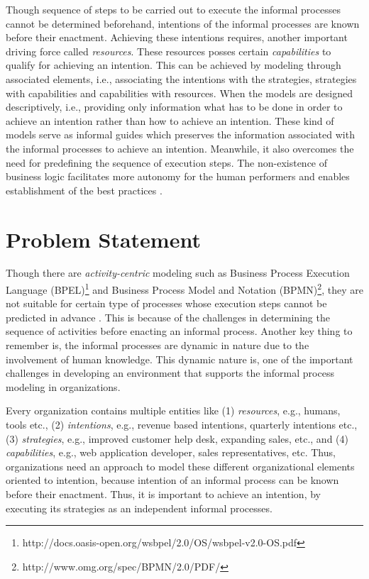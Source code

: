 Though sequence of steps to be carried out to execute the informal processes cannot be determined beforehand, intentions of the informal processes are known before their enactment. Achieving these intentions requires, another important driving force called \textit{resources}. These resources posses certain \textit{capabilities} to qualify for achieving an intention. This can be achieved by modeling through associated elements, i.e., associating the intentions with the strategies, strategies with capabilities and capabilities with resources. When the models are designed descriptively, i.e., providing only information what has to be done in order to achieve an intention rather than how to achieve an intention. These kind of models serve as informal guides which preserves the information associated with the informal processes to achieve an intention. Meanwhile, it also overcomes the need for predefining the sequence of execution steps. The non-existence of business logic facilitates more autonomy for the human performers and enables establishment of the best practices \cite{Sungur2014a}.

\section{Problem Statement}
\label{sec:problemstatement}
Though there are \textit{activity-centric} modeling such as Business Process Execution Language (BPEL)\footnote{http://docs.oasis-open.org/wsbpel/2.0/OS/wsbpel-v2.0-OS.pdf} and Business Process Model and Notation (BPMN)\footnote{http://www.omg.org/spec/BPMN/2.0/PDF/}, they are not suitable for certain type of processes whose execution steps cannot be predicted in advance \cite{Sungur2014a}. This is because of the challenges in determining the sequence of activities before enacting an informal process. Another key thing to remember is, the informal processes are dynamic in nature due to the involvement of human knowledge. This dynamic nature is, one of the important challenges in developing an environment that supports the informal process modeling in organizations.

Every organization contains multiple entities like (1) \textit{resources}, e.g., humans, tools etc., (2) \textit{intentions}, e.g., revenue based intentions, quarterly intentions etc., (3) \textit{strategies}, e.g., improved customer help desk, expanding sales, etc., and (4) \textit{capabilities}, e.g., web application developer, sales representatives, etc. Thus, organizations need an approach to model these different organizational elements oriented to intention, because intention of an informal process can be known before their enactment. Thus, it is important to achieve an intention, by executing its strategies as an independent informal processes.  

